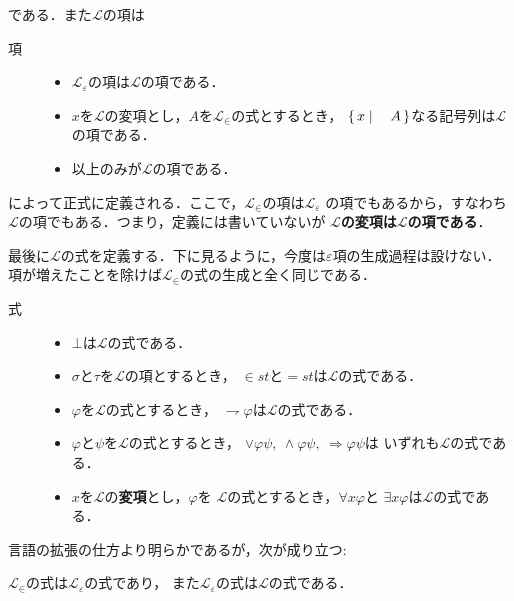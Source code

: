 	である．また$\mathcal{L}$の項は
	
	\begin{description}
		\item[項] 
			\begin{itemize}
				\item $\mathcal{L}_{\varepsilon}$の項は$\mathcal{L}$の項である．
				\item $x$を$\mathcal{L}$の変項とし，$A$を$\mathcal{L}_{\in}$の式とするとき，
					$\left\{\, x \mid \quad A\, \right\}$なる記号列は$\mathcal{L}$の項である．
				\item 以上のみが$\mathcal{L}$の項である．
			\end{itemize}
	\end{description}
	
	によって正式に定義される．ここで，$\mathcal{L}_{\in}$の項は$\mathcal{L}_{\varepsilon}$
	の項でもあるから，すなわち$\mathcal{L}$の項でもある．つまり，定義には書いていないが
	{\bf $\mathcal{L}$の変項は$\mathcal{L}$の項である}．
	
	最後に$\mathcal{L}$の式を定義する．下に見るように，今度は$\varepsilon$項の生成過程は設けない．
	項が増えたことを除けば$\mathcal{L}_{\in}$の式の生成と全く同じである．
	
	\begin{description}
		\item[式] 
			\begin{itemize}
				\item $\bot$は$\mathcal{L}$の式である．
				\item $\sigma$と$\tau$を$\mathcal{L}$の項とするとき，
					$\in st$と$=st$は$\mathcal{L}$の式である．
				\item $\varphi$を$\mathcal{L}$の式とするとき，
					$\rightharpoondown \varphi$は$\mathcal{L}$の式である．
				\item $\varphi$と$\psi$を$\mathcal{L}$の式とするとき，
					$\vee \varphi \psi,\ \wedge \varphi \psi,\ \Longrightarrow \varphi \psi$は
					いずれも$\mathcal{L}$の式である．
				\item $x$を$\mathcal{L}$の{\bf 変項}とし，$\varphi$を
					$\mathcal{L}$の式とするとき，$\forall x \varphi$と
					$\exists x \varphi$は$\mathcal{L}$の式である．
			\end{itemize}
	\end{description}
	
	言語の拡張の仕方より明らかであるが，次が成り立つ:
	
	\begin{screen}
		\begin{metathm}
			$\mathcal{L}_{\in}$の式は$\mathcal{L}_{\varepsilon}$の式であり，
			また$\mathcal{L}_{\varepsilon}$の式は$\mathcal{L}$の式である．
		\end{metathm}
	\end{screen}
	
